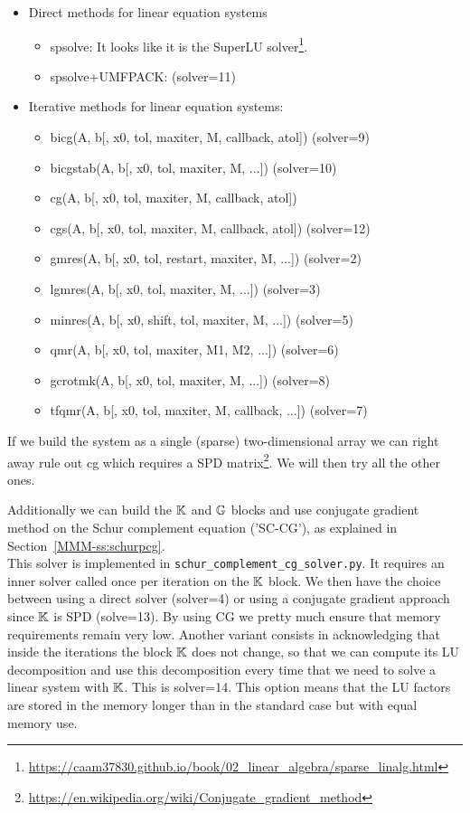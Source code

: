 \begin{itemize}
\item Direct methods for linear equation systems
\begin{itemize}
\item {\python spsolve}:  
It looks like it is the SuperLU solver\footnote{\url{https://caam37830.github.io/book/02_linear_algebra/sparse_linalg.html}}. 
\item {\python spsolve+UMFPACK}: ({\python solver=11}) 
\end{itemize}
\item Iterative methods for linear equation systems:
\begin{itemize}
\item {\python bicg}(A, b[, x0, tol, maxiter, M, callback, atol]) ({\python solver=9})
\item {\python bicgstab}(A, b[, x0, tol, maxiter, M, ...]) ({\python solver=10})
\item {\python cg}(A, b[, x0, tol, maxiter, M, callback, atol])
\item {\python cgs}(A, b[, x0, tol, maxiter, M, callback, atol])  ({\python solver=12})
\item {\python gmres}(A, b[, x0, tol, restart, maxiter, M, ...]) ({\python solver=2})
\item {\python lgmres}(A, b[, x0, tol, maxiter, M, ...]) ({\python solver=3})
\item {\python minres}(A, b[, x0, shift, tol, maxiter, M, ...]) ({\python solver=5})
\item {\python qmr}(A, b[, x0, tol, maxiter, M1, M2, ...]) ({\python solver=6})
\item {\python gcrotmk}(A, b[, x0, tol, maxiter, M, ...]) ({\python solver=8})
\item {\python tfqmr}(A, b[, x0, tol, maxiter, M, callback, ...]) ({\python solver=7})
\end{itemize}
\end{itemize}

If we build the system as a single (sparse) two-dimensional array 
we can right away rule out {\python cg} which requires 
a SPD matrix\footnote{\url{https://en.wikipedia.org/wiki/Conjugate_gradient_method}}. 
We will then try all the other ones.

Additionally we can build the ${\mathbb{K}}$ and ${\mathbb{G}}$ blocks and use conjugate gradient method on 
the Schur complement equation ('SC-CG'), as explained in Section~\ref{MMM-ss:schurpcg}.\\
This solver is implemented in {\tt schur\_complement\_cg\_solver.py}.
It requires an inner solver called once per iteration on the ${\mathbb{K}}$ block.
We then have the choice between using a direct solver ({\python solver=4})
or using a conjugate gradient
approach since ${\mathbb{K}}$ is SPD ({\python solve=13}). 
By using CG we pretty much ensure that memory 
requirements remain very low.
Another variant consists in acknowledging that inside the iterations the 
block ${\mathbb{K}}$ does not change, so that we can compute its LU decomposition
and use this decomposition every time that we need to solve a linear
system with ${\mathbb{K}}$. This is {\python solver=14}. 
This option means that the LU factors are stored in the memory longer than in the standard
case but with equal memory use.

